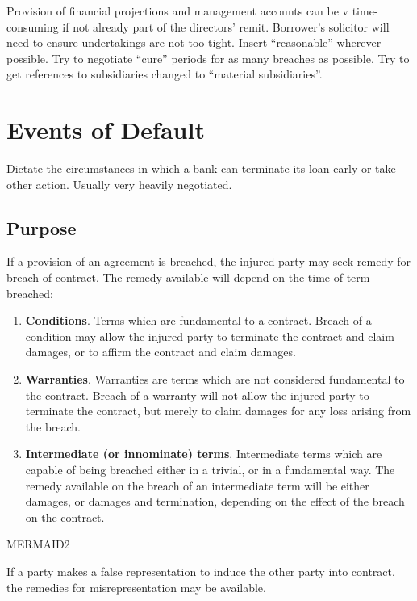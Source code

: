 \documentclass[
]{article}
\providecommand{\tightlist}{%
  \setlength{\itemsep}{0pt}\setlength{\parskip}{0pt}}
\begin{document}
Provision of financial projections and management accounts can be v
time-consuming if not already part of the directors' remit. Borrower's
solicitor will need to ensure undertakings are not too tight. Insert
``reasonable'' wherever possible. Try to negotiate ``cure'' periods for
as many breaches as possible. Try to get references to subsidiaries
changed to ``material subsidiaries''.

\hypertarget{events-of-default}{%
\section{Events of Default}\label{events-of-default}}

Dictate the circumstances in which a bank can terminate its loan early
or take other action. Usually very heavily negotiated.

\hypertarget{purpose}{%
\subsection{Purpose}\label{purpose}}

If a provision of an agreement is breached, the injured party may seek
remedy for breach of contract. The remedy available will depend on the
time of term breached:

\begin{enumerate}
\tightlist
\item
  \textbf{Conditions}. Terms which are fundamental to a contract. Breach
  of a condition may allow the injured party to terminate the contract
  and claim damages, or to affirm the contract and claim damages.
\item
  \textbf{Warranties}. Warranties are terms which are not considered
  fundamental to the contract. Breach of a warranty will not allow the
  injured party to terminate the contract, but merely to claim damages
  for any loss arising from the breach.
\item
  \textbf{Intermediate (or innominate) terms}. Intermediate terms which
  are capable of being breached either in a trivial, or in a fundamental
  way. The remedy available on the breach of an intermediate term will
  be either damages, or damages and termination, depending on the effect
  of the breach on the contract.
\end{enumerate}

MERMAID2

If a party makes a false representation to induce the other party into
contract, the remedies for misrepresentation may be available.
\end{document}
